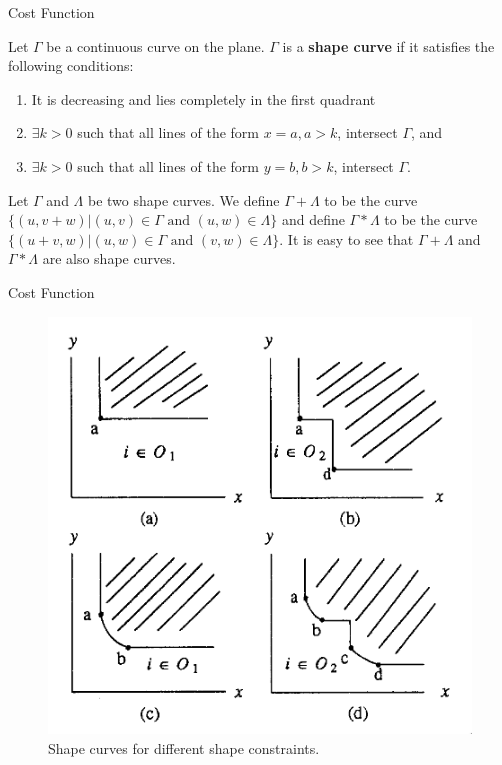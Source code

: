 \documentclass[xcolor=pdftex,dvipsnames,table]{beamer}
\begin{document}
\begin{frame}{Cost Function}
  \begin{definition}
    Let $\Gamma$ be a continuous curve on the plane. $\Gamma$ is a \textbf{shape curve} if it satisfies the following conditions:
  \begin{enumerate}
    \item It is decreasing and lies completely in the first quadrant
    \item $\exists k > 0$ such that all lines of the form $x = a, a > k$, intersect $\Gamma$, and
    \item $\exists k > 0$ such that all lines of the form $y = b, b > k$, intersect $\Gamma$.
  \end{enumerate}
  \end{definition}
  \begin{definition}
    Let $\Gamma$ and $\Lambda$ be two shape curves. We define $\Gamma + \Lambda$ to be the curve $\{(u, v+w)| (u,v) \in \Gamma \text{ and } (u, w) \in \Lambda\}$ and define $\Gamma * \Lambda$ to be the curve $\{(u+v, w)| (u,w) \in \Gamma \text{ and } (v, w) \in \Lambda\}$. It is easy to see that $\Gamma + \Lambda$ and $\Gamma * \Lambda$ are also shape curves.
  \end{definition}
\end{frame}

\begin{frame}{Cost Function}
  \begin{definition}
  \end{definition}
  \begin{figure}
    \includegraphics[scale=0.4]{shape_curves}
    \caption{Shape curves for different shape constraints.}
    \label{fig:5}
  \end{figure}
\end{frame}
\end{document}
